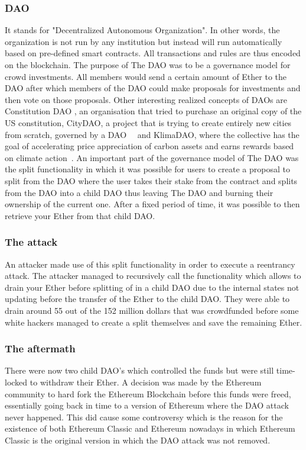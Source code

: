 \documentclass[10pt,conference]{IEEEtran}
\begin{document}
\subsubsection{DAO}
 It stands for "Decentralized Autonomous Organization". In other words, the organization is not run by any institution but instead will run automatically based on pre-defined smart contracts. All transactions and rules are thus encoded on the blockchain. The purpose of The DAO was to be a governance model for crowd investments. All members would send a certain amount of Ether to the DAO after which members of the DAO could make proposals for investments and then vote on those proposals. Other interesting realized concepts of DAOs are Constitution DAO \cite{constitution}, an organisation that tried to purchase an original copy of the US constitution, CityDAO, a project that is trying to create entirely new cities from scratch, governed by a DAO~\cite{citydao}~\cite{cryptocities} and KlimaDAO, where the collective has the goal of accelerating price appreciation of carbon assets and earns rewards based on climate action~\cite{klimadao}. 
 An important part of the governance model of The DAO was the split functionality in which it was possible for users to create a proposal to split from the DAO where the user takes their stake from the contract and splits from the DAO into a child DAO thus leaving The DAO and burning their ownership of the current one. After a fixed period of time, it was possible to then retrieve your Ether from that child DAO. 
 
\subsubsection{The attack}
An attacker made use of this split functionality in order to execute a reentrancy attack. The attacker managed to recursively call the functionality which allows to drain your Ether before splitting of in a child DAO due to the internal states not updating before the transfer of the Ether to the child DAO. They were able to drain around 55 out of the 152 million dollars that was crowdfunded before some white hackers managed to create a split themselves and save the remaining Ether. 

\subsubsection{The aftermath}
There were now two child DAO's which controlled the funds but were still time-locked to withdraw their Ether. A decision was made by the Ethereum community to hard fork the Ethereum Blockchain before this funds were freed, essentially going back in time to a version of Ethereum where the DAO attack never happened. This did cause some controversy which is the reason for the existence of both Ethereum Classic and Ethereum nowadays in which Ethereum Classic is the original version in which the DAO attack was not removed.
\end{document}
